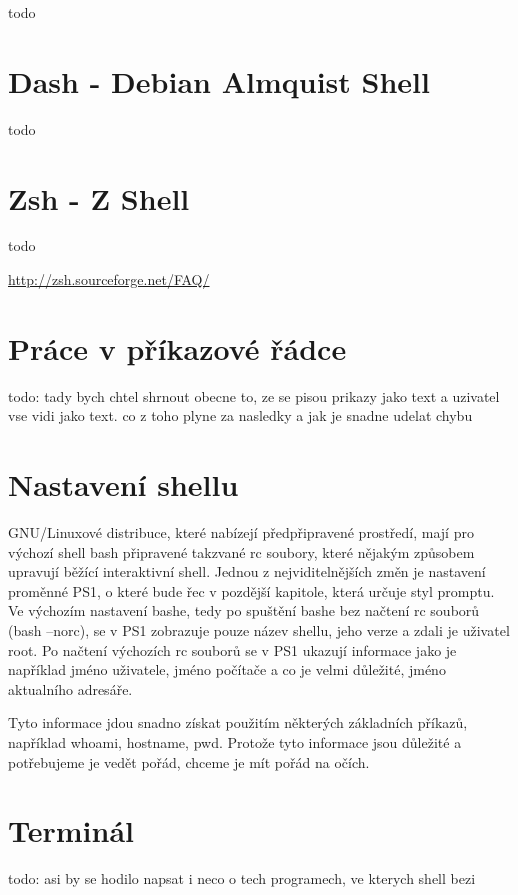 \documentclass[thesis=M,czech]{FITthesis}[2012/06/26]
\begin{document}
todo

\section{Dash - Debian Almquist Shell}

todo

\section{Zsh - Z Shell}

todo

\url{http://zsh.sourceforge.net/FAQ/}

\section{Práce v příkazové řádce}
todo: tady bych chtel shrnout obecne to, ze se pisou prikazy jako text a uzivatel vse vidi jako text. co z toho plyne za nasledky a jak je snadne udelat chybu

\section{Nastavení shellu}

GNU/Linuxové distribuce, které nabízejí předpřipravené prostředí, mají pro výchozí shell bash připravené takzvané rc soubory, které nějakým způsobem upravují běžící interaktivní shell. Jednou z nejviditelnějších změn je nastavení proměnné PS1, o které bude řec v pozdější kapitole, která určuje styl promptu. Ve výchozím nastavení bashe, tedy po spuštění bashe bez načtení rc souborů (bash --norc), se v PS1 zobrazuje pouze název shellu, jeho verze a zdali je uživatel root. Po načtení výchozích rc souborů se v PS1 ukazují informace jako je například jméno uživatele, jméno počítače a co je velmi důležité, jméno aktualního adresáře.

Tyto informace jdou snadno získat použitím některých základních příkazů, například whoami, hostname, pwd. Protože tyto informace jsou důležité a potřebujeme je vedět pořád, chceme je mít pořád na očích.

\section{Terminál}
todo: asi by se hodilo napsat i neco o tech programech, ve kterych shell bezi

\end{document}
